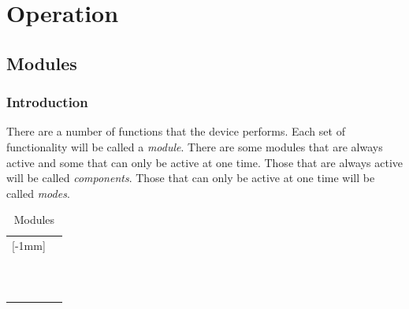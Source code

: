 \part{Operation} \label{Operation}

\chapter{Modules} \label{Modules}

\section{Introduction}

There are a number of functions that the device performs.  Each set of
functionality will be called a \textit{module}.  There are some modules that are
always active and some that can only be active at one time.  Those that are
always active will be called \textit{components}.  Those that can only be active
at one time will be called \textit{modes}.

\begin{table}[H]
\centering
\begin{tabu} { X[1,c,m] | X[1,c,m] }
  \thrule

  [-1mm]{}
  & \hyperref[USB]{} \\
  & \hyperref[Audio]{} \\
  & \hyperref[Alarm]{} \\
  & \hyperref[Power]{} \\ \mrule

  & \hyperref[Clock]{} \\
  & \hyperref[Set Alarm]{}  \\
  & \hyperref[Timer]{} \\
   & \hyperref[Set Clock]{} \\
  & \hyperref[Power Settings]{} \\
  & \hyperref[Touch Settings]{} \\
  & \hyperref[Set Night Light]{} \\
  \bhrule
\end{tabu}
\caption {Modules}
\end{table}

